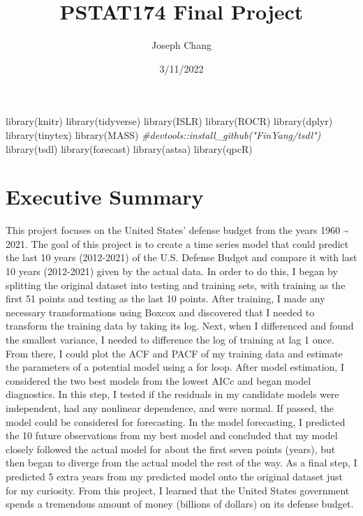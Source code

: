 \documentclass[
]{article}
\title{PSTAT174 Final Project}
\author{Joseph Chang}
\date{3/11/2022}
\newenvironment{Shaded}{\begin{snugshade}}{\end{snugshade}}
\newcommand{\CommentTok}[1]{\textcolor[rgb]{0.56,0.35,0.01}{\textit{#1}}}
\newcommand{\FunctionTok}[1]{\textcolor[rgb]{0.00,0.00,0.00}{#1}}
\newcommand{\NormalTok}[1]{#1}
\begin{document}
\maketitle

\begin{Shaded}
\begin{Highlighting}[]
\FunctionTok{library}\NormalTok{(knitr)}
\FunctionTok{library}\NormalTok{(tidyverse) }
\FunctionTok{library}\NormalTok{(ISLR) }
\FunctionTok{library}\NormalTok{(ROCR)}
\FunctionTok{library}\NormalTok{(dplyr)}
\FunctionTok{library}\NormalTok{(tinytex)}
\FunctionTok{library}\NormalTok{(MASS)}
\CommentTok{\#devtools::install\_github("FinYang/tsdl")}
\FunctionTok{library}\NormalTok{(tsdl)}
\FunctionTok{library}\NormalTok{(forecast)}
\FunctionTok{library}\NormalTok{(astsa)}
\FunctionTok{library}\NormalTok{(qpcR)}
\end{Highlighting}
\end{Shaded}

\hypertarget{executive-summary}{%
\section{Executive Summary}\label{executive-summary}}

This project focuses on the United States' defense budget from the years
1960 \textasciitilde{} 2021. The goal of this project is to create a
time series model that could predict the last 10 years (2012-2021) of
the U.S. Defense Budget and compare it with last 10 years (2012-2021)
given by the actual data. In order to do this, I began by splitting the
original dataset into testing and training sets, with training as the
first 51 points and testing as the last 10 points. After training, I
made any necessary transformations using Boxcox and discovered that I
needed to transform the training data by taking its log. Next, when I
differenced and found the smallest variance, I needed to difference the
log of training at lag 1 once. From there, I could plot the ACF and PACF
of my training data and estimate the parameters of a potential model
using a for loop. After model estimation, I considered the two best
models from the lowest AICc and began model diagnostics. In this step, I
tested if the residuals in my candidate models were independent, had any
nonlinear dependence, and were normal. If passed, the model could be
considered for forecasting. In the model forecasting, I predicted the 10
future observations from my best model and concluded that my model
closely followed the actual model for about the first seven points
(years), but then began to diverge from the actual model the rest of the
way. As a final step, I predicted 5 extra years from my predicted model
onto the original dataset just for my curiosity. From this project, I
learned that the United States government spends a tremendous amount of
money (billions of dollars) on its defense budget.
\end{document}
